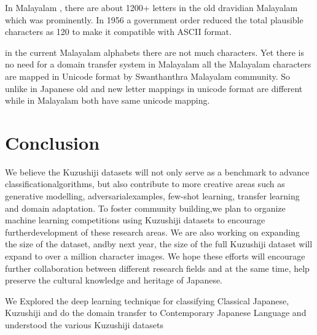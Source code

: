 \documentclass[12pt]{report}
\begin{document}
In  Malayalam , there are about 1200+ letters in the old dravidian
Malayalam which was prominently.
In 1956 a government order reduced the total plausible characters as
120 to make it compatible with ASCII
format.

in the current Malayalam alphabets there are not much characters.
Yet there is no need for a domain transfer system in Malayalam all the Malayalam
characters are mapped in Unicode format by Swanthanthra Malayalam
community. So unlike in Japanese old and new
letter mappings in unicode format are different while in Malayalam
both have same unicode mapping.



\chapter{Conclusion}

We believe the Kuzushiji datasets will not only serve as a benchmark
to advance classificationalgorithms, but also contribute to more
creative areas such as generative modelling, adversarialexamples,
few-shot learning, transfer learning and domain adaptation. To foster
community building,we plan to organize machine learning competitions
using Kuzushiji datasets to encourage furtherdevelopment of these
research areas. We are also working on expanding the size of the
dataset, andby next year, the size of the full Kuzushiji dataset will
expand to over a million character images. We hope these efforts will
encourage further collaboration between different research fields and
at the same time, help preserve the cultural knowledge and heritage of
Japanese.

We Explored the deep learning technique for classifying Classical
Japanese, Kuzushiji and do the domain transfer to Contemporary
Japanese Language and understood the various Kuzushiji datasets
\end{document}
